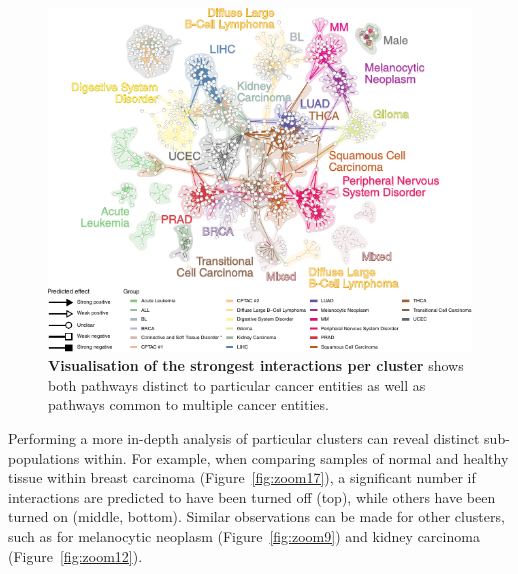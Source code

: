 \begin{figure}[htb!]
	\centering
	\includegraphics[width=.85\linewidth]{fig/tcga/grouped_interactions.pdf}
	\caption{
		\textbf{Visualisation of the strongest interactions per cluster} shows both pathways distinct to particular cancer entities as well as pathways common to multiple cancer entities.
	}
	\label{fig:tcga_network}
\end{figure}

Performing a more in-depth analysis of particular clusters can reveal distinct sub-populations within. For example, when comparing samples of normal and healthy tissue within breast carcinoma (Figure~\ref{fig:zoom17}), a significant number if interactions are predicted to have been turned off (top), while others have been turned on (middle, bottom). Similar observations can be made for other clusters, such as for melanocytic neoplasm (Figure~\ref{fig:zoom9}) and kidney carcinoma (Figure~\ref{fig:zoom12}).

